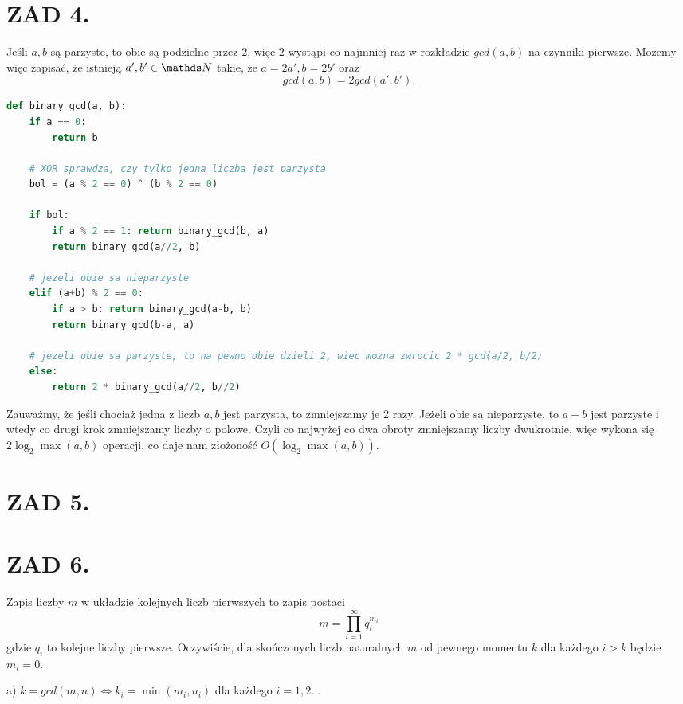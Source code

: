 \documentclass{article}[13pt]
\begin{document}
\section*{ZAD 4.}

Jeśli $a,b$ są parzyste, to obie są podzielne przez $2$, więc $2$ wystąpi co najmniej raz w rozkładzie $gcd(a,b)$ na czynniki pierwsze. Możemy więc zapisać, że istnieją $a',b'\in\N$ takie, że $a=2a',b=2b'$ oraz
$$gcd(a,b)=2gcd(a',b').$$

\begin{lstlisting}[language=Python]
def binary_gcd(a, b):
    if a == 0:
        return b

    # XOR sprawdza, czy tylko jedna liczba jest parzysta
    bol = (a % 2 == 0) ^ (b % 2 == 0)

    if bol:
        if a % 2 == 1: return binary_gcd(b, a)
        return binary_gcd(a//2, b)

    # jezeli obie sa nieparzyste
    elif (a+b) % 2 == 0:
        if a > b: return binary_gcd(a-b, b)
        return binary_gcd(b-a, a)
    
    # jezeli obie sa parzyste, to na pewno obie dzieli 2, wiec mozna zwrocic 2 * gcd(a/2, b/2)
    else:
        return 2 * binary_gcd(a//2, b//2)
\end{lstlisting}

Zauważmy, że jeśli chociaż jedna z liczb $a,b$ jest parzysta, to zmniejszamy je 2 razy. Jeżeli obie są nieparzyste, to $a-b$ jest parzyste i wtedy co drugi krok zmniejszamy liczby o polowe. Czyli co najwyżej co dwa obroty zmniejszamy liczby dwukrotnie, więc wykona się $2\log_2\max(a,b)$ operacji, co daje nam złożoność $O(\log_2\max(a,b))$.


\section*{ZAD 5.}

\section*{ZAD 6.}

Zapis liczby $m$ w układzie kolejnych liczb pierwszych to zapis postaci
$$m=\prod\limits_{i=1}^\infty q_i^{m_i}$$
gdzie $q_i$ to kolejne liczby pierwsze. Oczywiście, dla skończonych liczb naturalnych $m$ od pewnego momentu $k$ dla każdego $i>k$ będzie $m_i=0$.
\medskip

{\color{def}a) $k=gcd(m,n)\iff k_i=\min(m_i,n_i)$ dla każdego $i=1,2...$}
\smallskip
\end{document}
